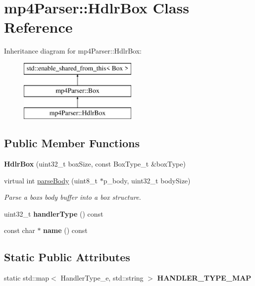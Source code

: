 \hypertarget{classmp4_parser_1_1_hdlr_box}{}\section{mp4\+Parser\+::Hdlr\+Box Class Reference}
\label{classmp4_parser_1_1_hdlr_box}
Inheritance diagram for mp4\+Parser\+::Hdlr\+Box\+:\begin{figure}[H]
\begin{center}
\leavevmode
\includegraphics[height=3.000000cm]{classmp4_parser_1_1_hdlr_box}
\end{center}
\end{figure}
\subsection*{Public Member Functions}
\begin{DoxyCompactItemize}
\item 
\mbox{\label{classmp4_parser_1_1_hdlr_box_a45c422be90d346c8b1a7bbeac9b209ef}} 
{\bfseries Hdlr\+Box} (uint32\+\_\+t box\+Size, const Box\+Type\+\_\+t \&box\+Type)
\item 
virtual int \mbox{\hyperlink{classmp4_parser_1_1_hdlr_box_a2bd53771c96860d30067c665f2a7a07a}{parse\+Body}} (uint8\+\_\+t $\ast$p\+\_\+body, uint32\+\_\+t body\+Size)
\begin{DoxyCompactList}\small\item\em Parse a box\textquotesingle{}s body buffer into a box structure. \end{DoxyCompactList}\item 
\mbox{\label{classmp4_parser_1_1_hdlr_box_aa4d2293675d275206b42e5952e9188a5}} 
uint32\+\_\+t {\bfseries handler\+Type} () const
\item 
\mbox{\label{classmp4_parser_1_1_hdlr_box_af24107fe2a9a63e6bda6d0dddaa40292}} 
const char $\ast$ {\bfseries name} () const
\end{DoxyCompactItemize}
\subsection*{Static Public Attributes}
\begin{DoxyCompactItemize}
\item 
static std\+::map$<$ Handler\+Type\+\_\+e, std\+::string $>$ {\bfseries H\+A\+N\+D\+L\+E\+R\+\_\+\+T\+Y\+P\+E\+\_\+\+M\+AP}
\end{DoxyCompactItemize}
